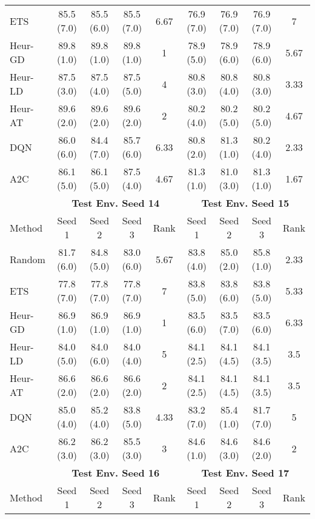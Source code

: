 \begin{table}[t]
{\begin{tabular}{lcccccccc}
ETS        & 85.5 (7.0)  & 85.5 (6.0)  & 85.5 (7.0)  & 6.67 & 76.9 (7.0)  & 76.9 (7.0)  & 76.9 (7.0)  & 7    \\
Heur-GD & 89.8 (1.0)  & 89.8 (1.0)  & 89.8 (1.0)  & 1    & 78.9 (5.0)  & 78.9 (6.0)  & 78.9 (6.0)  & 5.67 \\
Heur-LD & 87.5 (3.0)  & 87.5 (4.0)  & 87.5 (5.0)  & 4    & 80.8 (3.0)  & 80.8 (4.0)  & 80.8 (3.0)  & 3.33 \\
Heur-AT & 89.6 (2.0)  & 89.6 (2.0)  & 89.6 (2.0)  & 2    & 80.2 (4.0)  & 80.2 (5.0)  & 80.2 (5.0)  & 4.67 \\
DQN        & 86.0 (6.0)  & 84.4 (7.0)  & 85.7 (6.0)  & 6.33 & 80.8 (2.0)  & 81.3 (1.0)  & 80.2 (4.0)  & 2.33 \\
A2C        & 86.1 (5.0)  & 86.1 (5.0)  & 87.5 (4.0)  & 4.67 & 81.3 (1.0)  & 81.0 (3.0)  & 81.3 (1.0)  & 1.67 \\ \midrule
\textbf{}  & \multicolumn{4}{c}{\textbf{Test Env. Seed 14}} & \multicolumn{4}{c}{\textbf{Test Env. Seed 15}} \\
\cmidrule(lr){2-5} \cmidrule(lr){6-9} 
Method     & Seed 1      & Seed 2      & Seed 3      & Rank & Seed 1      & Seed 2      & Seed 3      & Rank \\ \midrule
Random     & 81.7 (6.0)  & 84.8 (5.0)  & 83.0 (6.0)  & 5.67 & 83.8 (4.0)  & 85.0 (2.0)  & 85.8 (1.0)  & 2.33 \\
ETS        & 77.8 (7.0)  & 77.8 (7.0)  & 77.8 (7.0)  & 7    & 83.8 (5.0)  & 83.8 (6.0)  & 83.8 (5.0)  & 5.33 \\
Heur-GD & 86.9 (1.0)  & 86.9 (1.0)  & 86.9 (1.0)  & 1    & 83.5 (6.0)  & 83.5 (7.0)  & 83.5 (6.0)  & 6.33 \\
Heur-LD & 84.0 (5.0)  & 84.0 (6.0)  & 84.0 (4.0)  & 5    & 84.1 (2.5)  & 84.1 (4.5)  & 84.1 (3.5)  & 3.5  \\
Heur-AT & 86.6 (2.0)  & 86.6 (2.0)  & 86.6 (2.0)  & 2    & 84.1 (2.5)  & 84.1 (4.5)  & 84.1 (3.5)  & 3.5  \\
DQN        & 85.0 (4.0)  & 85.2 (4.0)  & 83.8 (5.0)  & 4.33 & 83.2 (7.0)  & 85.4 (1.0)  & 81.7 (7.0)  & 5    \\
A2C        & 86.2 (3.0)  & 86.2 (3.0)  & 85.5 (3.0)  & 3    & 84.6 (1.0)  & 84.6 (3.0)  & 84.6 (2.0)  & 2    \\ \midrule
\textbf{}  & \multicolumn{4}{c}{\textbf{Test Env. Seed 16}} & \multicolumn{4}{c}{\textbf{Test Env. Seed 17}} \\
\cmidrule(lr){2-5} \cmidrule(lr){6-9} 
Method     & Seed 1      & Seed 2      & Seed 3      & Rank & Seed 1      & Seed 2      & Seed 3      & Rank \\ \midrule

\end{tabular}}
\end{table}
